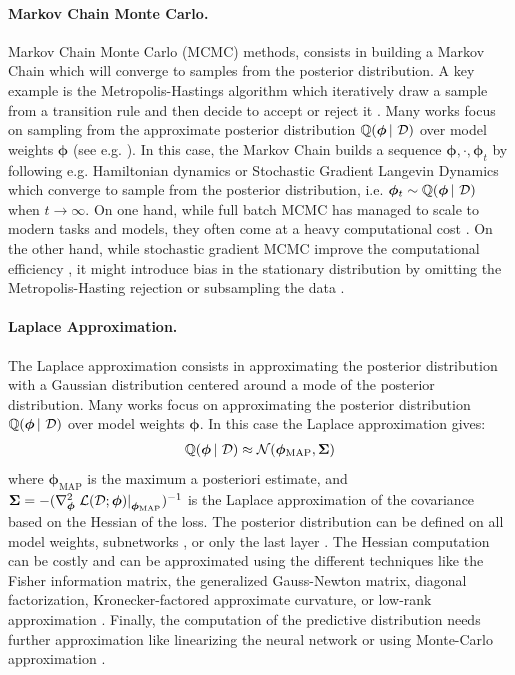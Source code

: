 \paragraph*{Markov Chain Monte Carlo.} Markov Chain Monte Carlo (MCMC) methods, consists in building a Markov Chain which will converge to samples from the posterior distribution. A key example is the Metropolis-Hastings algorithm which iteratively draw a sample from a transition rule and then decide to accept or reject it \cite{robert2015metropolis}. Many works focus on sampling from the approximate posterior distribution $\operatorname{\mathbb{Q}}(\bm{\phi} \,|\, \operatorname{\mathcal{D}})$ over model weights $\bm{\phi}$ (see e.g. \citep{duane1987hybrid,welling2011langevin}). In this case, the Markov Chain builds a sequence $\bm{\phi},\cdot,\bm{\phi}_t$ by following e.g. Hamiltonian dynamics \citep{duane1987hybrid} or Stochastic Gradient Langevin Dynamics \cite{welling2011langevin,garriga-alonso2021exact,ma2015mcmc} which converge to sample from the posterior distribution, i.e. $\bm{\phi}_t \sim \operatorname{\mathbb{Q}}(\bm{\phi} \,|\, \operatorname{\mathcal{D}})$ when $t \rightarrow \infty$. On one hand, while full batch MCMC has managed to scale to modern tasks and models, they often come at a heavy computational cost \citep{what-bnn-posterior}. On the other hand, while stochastic gradient MCMC improve the computational efficiency \cite{welling2011langevin,garriga-alonso2021exact,ma2015mcmc}, it might introduce bias in the stationary distribution by omitting the Metropolis-Hasting rejection or subsampling the data \citep{betancourt2015data,what-bnn-posterior}.

\paragraph*{Laplace Approximation.} The Laplace approximation consists in approximating the posterior distribution with a Gaussian distribution centered around a mode of the posterior distribution. Many works focus on approximating the posterior distribution $\operatorname{\mathbb{Q}}(\bm{\phi} \,|\, \operatorname{\mathcal{D}})$ over model weights $\bm{\phi}$. In this case the Laplace approximation gives:
\begin{align*}
    \operatorname{\mathbb{Q}}(\bm{\phi} \,|\, \operatorname{\mathcal{D}}) \approx \operatorname{\mathcal{N}}(\bm{\phi}_\text{MAP}, \bm{\Sigma})
\end{align*}
where $\bm{\phi}_\text{MAP}$ is the maximum a posteriori estimate, and $\bm{\Sigma}=-(\nabla_{\bm{\phi}}^2 \left.\operatorname{\mathcal{L}}(\operatorname{\mathcal{D}};\bm{\phi})\right|_{\bm{\phi}_\text{MAP}})^{-1}$ is the Laplace approximation of the covariance based on the Hessian of the loss. The posterior distribution can be defined on all model weights, subnetworks \cite{daxberger2021bayesian}, or only the last layer \cite{bayesian-a-bit}. The Hessian computation can be costly and can be approximated using the different techniques like the Fisher information matrix, the generalized Gauss-Newton matrix, diagonal factorization, Kronecker-factored approximate curvature, or low-rank approximation \citep{daxberger2021laplace}. Finally, the computation of the predictive distribution needs further approximation like linearizing the neural network or using Monte-Carlo approximation \citep{daxberger2021laplace}.

